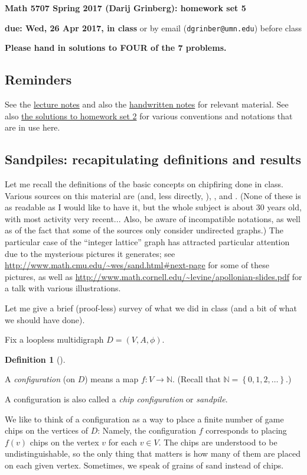\documentclass[numbers=enddot,12pt,final,onecolumn,notitlepage]{scrartcl}%
\theoremstyle{definition}
\newtheorem{defi}[theo]{Definition}
\newenvironment{definition}[1][]
{\begin{defi}[#1]\begin{leftbar}}
{\end{leftbar}\end{defi}}
\newcommand{\NN}{\mathbb{N}}
\newcommand{\set}[1]{\left\{ #1 \right\}}
\newcommand{\tup}[1]{\left( #1 \right)}
\begin{document}
\begin{center}
\textbf{Math 5707 Spring 2017 (Darij Grinberg): homework set 5}

\textbf{due: Wed, 26 Apr 2017, in class} or by email
(\texttt{dgrinber@umn.edu}) before class

\textbf{Please hand in solutions to FOUR of the 7 problems.}
\end{center}


\subsection{Reminders}

See the
\href{http://www-users.math.umn.edu/~dgrinber/5707s17/nogra.pdf}{lecture notes}
and also the
\href{http://www-users.math.umn.edu/~dgrinber/5707s17/}{handwritten notes}
for relevant material.
See also
\href{http://www-users.math.umn.edu/~dgrinber/5707s17/hw2s.pdf}{the solutions to homework set 2}
for various conventions and notations that are in use here.

\subsection{Sandpiles: recapitulating definitions and results}

Let me recall the definitions of the basic concepts on chipfiring
done in class.
Various sources on this material are
\cite{BjoLov92} (and, less directly, \cite{BjLoSh91}),
\cite{HLMPPW13}, \cite[Lectures 29--31]{Musike09} and \cite{CorPet16}.
(None of these is as readable as I would like to have it, but the
whole subject is about 30 years old, with most activity very
recent...
Also, be aware of incompatible notations, as well as of the fact that
some of the sources only consider undirected graphs.)
The particular case of the ``integer lattice'' graph has attracted
particular attention due to the mysterious pictures it generates;
see \url{http://www.math.cmu.edu/~wes/sand.html#next-page} for some
of these pictures, as well as
\url{http://www.math.cornell.edu/~levine/apollonian-slides.pdf} for a
talk with various illustrations.

Let me give a brief (proof-less) survey of what we did in class (and
a bit of what we should have done).

Fix a loopless multidigraph $D = \tup{V, A, \phi}$.

\begin{definition}
A \textit{configuration} (on $D$) means a map $f : V \to \NN$.
(Recall that $\NN = \set{0, 1, 2, \ldots}$.)

A configuration is also called a \textit{chip configuration} or
\textit{sandpile}.

We like to think of a configuration as a way to place
a finite number of game chips on the vertices of $D$:
Namely, the configuration $f$ corresponds to placing
$f \tup{v}$ chips on the vertex $v$ for each $v \in V$.
The chips are understood to be undistinguishable, so the
only thing that matters is how many of them are placed on
each given vertex.
Sometimes, we speak of grains of sand instead of chips.
\end{definition}
\end{document}
